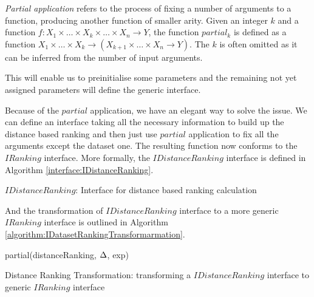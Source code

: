 \begin{definition}
	\emph{Partial application} refers to the process of fixing a number of arguments to a function, producing another function of smaller arity. Given an integer $k$ and a function $f:X_1 \times \dots \times X_k \times \dots \times X_n \rightarrow Y$, the function $partial_k$  is defined as a function $X_1 \times \dots \times X_k \rightarrow (X_{k+1} \times \dots \times X_n \rightarrow Y)$. The $k$ is often omitted as it can be inferred from the number of input arguments.
\end{definition}

This will enable us to preinitialise some parameters and the remaining not yet assigned parameters will define the generic interface.

Because of the $partial$ application, we have an elegant way to solve the issue. We can define an interface taking all the necessary information to build up the distance based ranking and then just use $partial$ application to fix all the arguments except the dataset one. The resulting function now conforms to the $IRanking$ interface.
More formally, the $IDistanceRanking$ interface is defined in Algorithm \ref{interface:IDistanceRanking}.

\IncMargin{1em}
\begin{algorithm}
	\BlankLine
	\caption{$IDistanceRanking$: Interface for distance based ranking calculation}
	\label{interface:IDistanceRanking}
\end{algorithm}\DecMargin{1em}

And the transformation of $IDistanceRanking$ interface to a more generic $IRanking$ interface is outlined in Algorithm \ref{algorithm:IDatasetRankingTransformarmation}.
\IncMargin{1em}
\begin{algorithm}
	\BlankLine
	\Return partial(distanceRanking, $\Delta$, exp)\;
	\caption{Distance Ranking Transformation: transforming a $IDistanceRanking$ interface to generic $IRanking$ interface}
	\label{algorithm:IDatasetRankingTransformarmation}
\end{algorithm}\DecMargin{1em}

